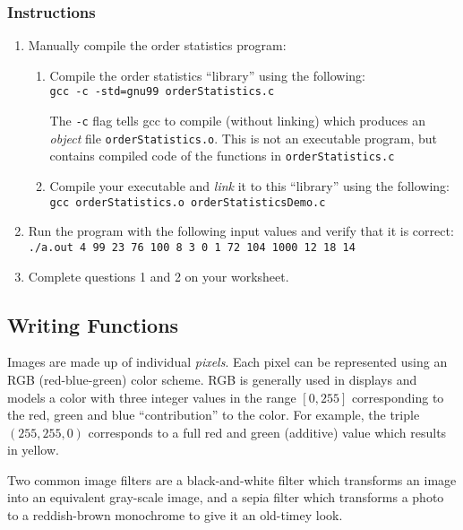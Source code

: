 \documentclass[12pt]{scrartcl}
\begin{document}
\subsubsection*{Instructions}

\begin{enumerate}
  \item Manually compile the order statistics program:
  \begin{enumerate}
    \item Compile the order statistics ``library'' using the following: \\
    \texttt{gcc -c -std=gnu99 orderStatistics.c} 
    
    The \texttt{-c} flag tells gcc to compile (without linking)
    which produces an \emph{object} file \texttt{orderStatistics.o}.
    This is not an executable program, but contains compiled code of
    the functions in \texttt{orderStatistics.c}
    \item Compile your executable and \emph{link} it to this ``library''
    using the following: \\
    \texttt{gcc orderStatistics.o orderStatisticsDemo.c}
  \end{enumerate}
  \item Run the program with the following input values and verify
  that it is correct: \\
	\texttt{./a.out 4 99 23 76 100 8 3 0 1 72 104 1000 12 18 14}
  \item Complete questions 1 and 2 on your worksheet.
\end{enumerate}

\subsection{Writing Functions}

Images are made up of individual \emph{pixels}.  Each pixel can be 
represented using an RGB (red-blue-green) color scheme.  RGB is 
generally used in displays and models a color with three integer 
values in the range $[0, 255]$ corresponding to the red, green and 
blue ``contribution'' to the color.  For example, the triple 
$(255, 255, 0)$ corresponds to a full red and green (additive) value
which results in yellow.  

Two common image filters are a black-and-white filter which transforms
an image into an equivalent gray-scale image, and a sepia filter which
transforms a photo to a reddish-brown monochrome to give it an old-timey
look.
\end{document}
